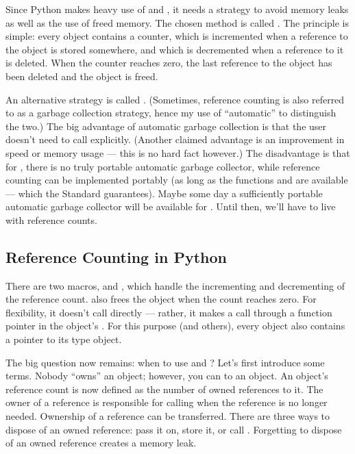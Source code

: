 \documentclass{manual}
\begin{document}
Since Python makes heavy use of  and
, it needs a strategy to avoid memory leaks as well
as the use of freed memory.  The chosen method is called
.  The principle is simple: every object
contains a counter, which is incremented when a reference to the
object is stored somewhere, and which is decremented when a reference
to it is deleted.  When the counter reaches zero, the last reference
to the object has been deleted and the object is freed.

An alternative strategy is called .
(Sometimes, reference counting is also referred to as a garbage
collection strategy, hence my use of ``automatic'' to distinguish the
two.)  The big advantage of automatic garbage collection is that the
user doesn't need to call  explicitly.  (Another claimed
advantage is an improvement in speed or memory usage --- this is no
hard fact however.)  The disadvantage is that for \C{}, there is no
truly portable automatic garbage collector, while reference counting
can be implemented portably (as long as the functions 
and  are available --- which the \C{} Standard guarantees).
Maybe some day a sufficiently portable automatic garbage collector
will be available for \C{}.  Until then, we'll have to live with
reference counts.

\subsection{Reference Counting in Python}
\label{refcountsInPython}

There are two macros,  and ,
which handle the incrementing and decrementing of the reference count.
 also frees the object when the count reaches zero.
For flexibility, it doesn't call  directly --- rather, it
makes a call through a function pointer in the object's .  For this purpose (and others), every object also contains a
pointer to its type object.

The big question now remains: when to use  and
?  Let's first introduce some terms.  Nobody
``owns'' an object; however, you can  to an
object.  An object's reference count is now defined as the number of
owned references to it.  The owner of a reference is responsible for
calling  when the reference is no longer
needed.  Ownership of a reference can be transferred.  There are three
ways to dispose of an owned reference: pass it on, store it, or call
.  Forgetting to dispose of an owned reference
creates a memory leak.
\end{document}
